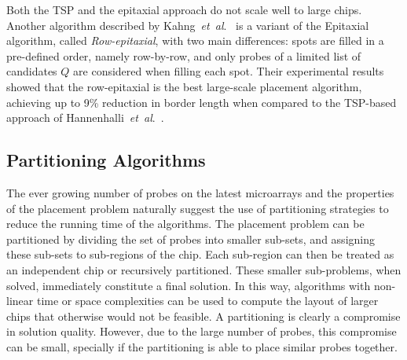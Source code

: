 \documentclass{llncs}
\newcommand{\ignore}[1]{}
\begin{document}
\ignore{
The major problem with the Epitaxial and the TSP-based algorithm is that they
have at least quadratic time complexity and thus are not scalable for the
latest million-probe microarrays. According to their experiments, the TSP
approach needed around 32 minutes to produce the layout of a 200\,x\,200
chip, whereas the epitaxial algorithm needed 74 minutes on average. For a
500\,x\,500 chip, the TSP took over 30 hours to complete, whereas the
epitaxial algorithm did not complete ``due to prohibitively large running
time or memory requirements'' \cite{KAHNG02}.
}

\ignore{
This observation has led to the development of two new algorithms by
\cite{KAHNG03A}. The first one, called Sliding-window Matching (SWM), is not
exactly a placement algorithm as it iteratively improves an initial placement
that can be constructed by, for instance, TSP and 1-threading. Improvements
are achieved by selecting an independent set of spots inside the window and
optimally replacing their probes using a minimum-weight perfect matching
algorithm. The term independent refers to probes that can be replaced without
affecting the border length of the other selected probes.
}

Both the TSP and the epitaxial approach do not scale well to large
chips.  Another algorithm described by Kahng~{\it et~al}.~\cite{KAHNG03A} is a variant
of the Epitaxial algorithm, called \emph{Row-epitaxial}, with two main
differences: spots are filled in a pre-defined order, namely
row-by-row, and only probes of a limited list of candidates $Q$ are
considered when filling each spot. Their experimental results showed
that the row-epitaxial is the best large-scale placement algorithm,
achieving up to 9\% reduction in border length when compared to the
TSP-based approach of Hannenhalli~{\it et~al}.\ \cite{HANNENHALLI02}.

\subsection{Partitioning Algorithms}
\label{sec:partition}

The ever growing number of probes on the latest microarrays and the properties of
the placement problem naturally suggest the use of partitioning strategies to reduce
the running time of the algorithms. The placement problem can be partitioned by
dividing the set of probes into smaller sub-sets, and assigning these sub-sets to
sub-regions of the chip. Each sub-region can then be treated as an independent chip
or recursively partitioned. These smaller sub-problems, when solved, immediately
constitute a final solution. In this way, algorithms with non-linear time or space
complexities can be used to compute the layout of larger chips that otherwise would not
be feasible. A partitioning is clearly a compromise in solution quality. However,
due to the large number of probes, this compromise can be small, specially if the
partitioning is able to place similar probes together.
\end{document}
